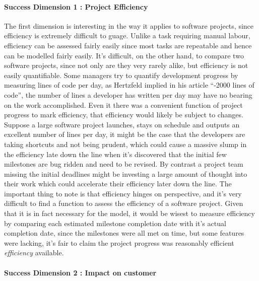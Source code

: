 \paragraph{Success Dimension 1 : Project Efficiency}
The first dimension is interesting in the way it applies to software projects, since efficiency is extremely difficult to guage. Unlike a task requiring manual labour, efficiency can be assessed fairly easily since most tasks are repeatable and hence can be modelled fairly easily. It's difficult, on the other hand, to compare two software projects, since not only are they very rarely alike, but efficiency is not easily quantifiable. Some managers try to quantify development progress by measuring lines of code per day, as Hertzfeld implied in his article ``-2000 lines of code'', the number of lines a developer has written per day may have no bearing on the work accomplished. Even it there was a convenient function of project progress to mark efficiency, that efficiency would likely be subject to changes. Suppose a large software project launches, stays on schedule and outputs an excellent number of lines per day, it might be the case that the developers are taking shortcuts and not being prudent, which could cause a massive slump in the efficiency late down the line when it's discovered that the initial few milestones are bug ridden and need to be revised. By contrast a project team missing the initial deadlines might be investing a large amount of thought into their work which could accelerate their efficiency later down the line. The important thing to note is that efficiency hinges on perspective, and it's very difficult to find a function to assess the efficiency of a software project.
Given that it is in fact necessary for the model, it would be wisest to measure efficiency by comparing each estimated milestone completion date with it's actual completion date, since the milestones were all met on time, but some features were lacking, it's fair to claim the project progress was reasonably efficient \emph{efficiency} available. 

\paragraph{Success Dimension 2 : Impact on customer}


